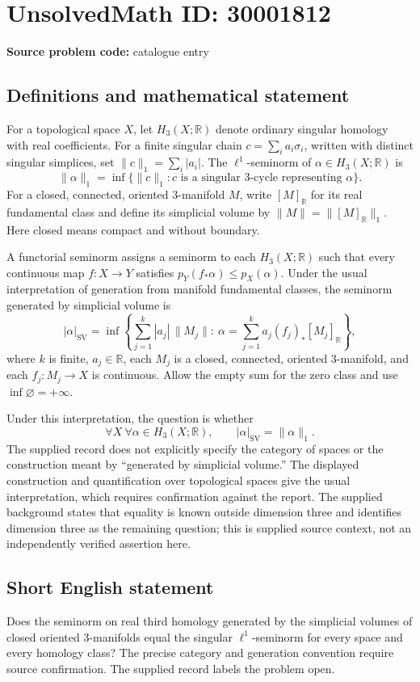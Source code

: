 \documentclass[11pt]{article}
\newcommand{\R}{\mathbb{R}}
\begin{document}
\section*{UnsolvedMath ID: 30001812}
\textbf{Source problem code:} catalogue entry
\subsection{Definitions and mathematical statement}
For a topological space \(X\), let \(H_3(X;\R)\) denote ordinary singular homology with real coefficients. For a finite singular chain \(c=\sum_i a_i\sigma_i\), written with distinct singular simplices, set \(\lVert c\rVert_1=\sum_i|a_i|\). The \(\ell^1\)-seminorm of \(\alpha\in H_3(X;\R)\) is
\[
\lVert\alpha\rVert_1=\inf\{\lVert c\rVert_1:c\text{ is a singular }3\text{-cycle representing }\alpha\}.
\]
For a closed, connected, oriented \(3\)-manifold \(M\), write \([M]_{\R}\) for its real fundamental class and define its simplicial volume by \(\lVert M\rVert=\lVert[M]_{\R}\rVert_1\). Here closed means compact and without boundary.

A functorial seminorm assigns a seminorm to each \(H_3(X;\R)\) such that every continuous map \(f:X\to Y\) satisfies \(p_Y(f_*\alpha)\leq p_X(\alpha)\). Under the usual interpretation of generation from manifold fundamental classes, the seminorm generated by simplicial volume is
\[
|\alpha|_{\mathrm{SV}}=\inf\left\{\sum_{j=1}^{k}|a_j|\,\lVert M_j\rVert:\ \alpha=\sum_{j=1}^{k}a_j(f_j)_*[M_j]_{\R}\right\},
\]
where \(k\) is finite, \(a_j\in\R\), each \(M_j\) is a closed, connected, oriented \(3\)-manifold, and each \(f_j:M_j\to X\) is continuous. Allow the empty sum for the zero class and use \(\inf\varnothing=+\infty\).

Under this interpretation, the question is whether
\[
\forall X\ \forall\alpha\in H_3(X;\R),\qquad |\alpha|_{\mathrm{SV}}=\lVert\alpha\rVert_1.
\]
The supplied record does not explicitly specify the category of spaces or the construction meant by ``generated by simplicial volume.'' The displayed construction and quantification over topological spaces give the usual interpretation, which requires confirmation against the report. The supplied background states that equality is known outside dimension three and identifies dimension three as the remaining question; this is supplied source context, not an independently verified assertion here.
\subsection{Short English statement}
Does the seminorm on real third homology generated by the simplicial volumes of closed oriented \(3\)-manifolds equal the singular \(\ell^1\)-seminorm for every space and every homology class? The precise category and generation convention require source confirmation. The supplied record labels the problem open.
\end{document}
